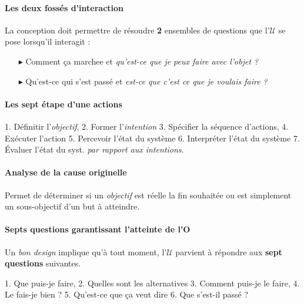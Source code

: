 \documentclass{report}
\begin{document}
\begin{multicols*}{3}
\begin{itemize}
    \end{itemize} 




    \paragraph{Les deux fossés d'interaction}
    La conception doit permettre de résoudre \textbf{2} ensembles de questions 
    que l'$\mathcal{U}$ se pose lorsqu'il interagit :
    \begin{itemize}
      \item [$\blacktriangleright$ ] Comment ça marchee et 
        \textit{qu'est-ce que je peux faire avec l'objet ?}  
      \item [$\blacktriangleright$ ] Qu'est-ce qui s'est passé et 
        \textit{est-ce que c'est ce que je voulais faire ?}  
    \end{itemize}

    \paragraph{Les sept étape d'une actions}
    1. Définitir l'\textit{objectif}, 2. Former l'\textit{intention}    
    3. Spécifier la séquence d'actions, 4. Exécuter l'action
    5. Percevoir l'état du système 6. Interpréter l'état du système 
    7. Évaluer l'état du syst. \textit{par rapport aux intentions}.   


    \paragraph{Analyse de la cause originelle}
    Permet de déterminer si un \textit{objectif} est réelle 
    la fin souhaitée ou est simplement un sous-objectif 
    d'un but à atteindre. 

    \paragraph{Septs questions garantissant l'atteinte de l'O}
    Un \textit{bon design} implique qu'à tout moment, l'$\mathcal{U}$ 
    parvient à répondre aux \textbf{sept questions} suivantes.   

    1. Que puis-je faire, 2. Quelles sont les alternatives 
    3. Comment puis-je le faire, 4. Le fais-je bien ? 
    5. Qu'est-ce que ça veut dire 6. Que s'est-il passé ? 



\end{multicols*}
\end{document}
